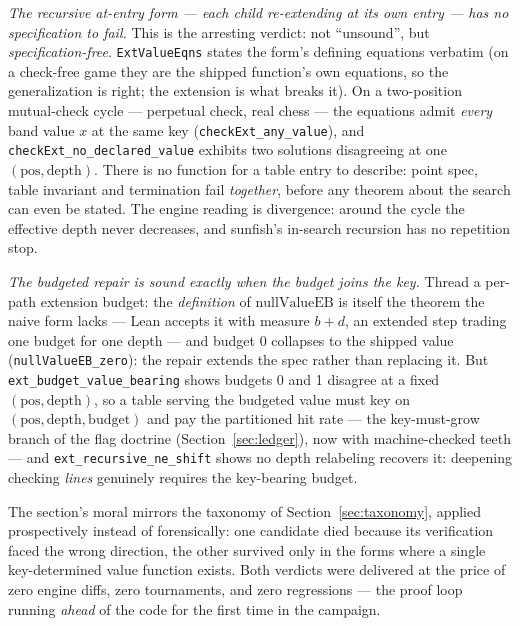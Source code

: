 \documentclass[11pt]{article}
\theoremstyle{plain}
\theoremstyle{definition}
\theoremstyle{remark}
\begin{document}
\emph{The recursive at-entry form --- each child re-extending at its
own entry --- has no specification to fail.}  This is the arresting
verdict: not ``unsound'', but \emph{specification-free}.
\texttt{ExtValueEqns} states the form's defining equations verbatim
(on a check-free game they are the shipped function's own equations,
so the generalization is right; the extension is what breaks it).  On
a two-position mutual-check cycle --- perpetual check, real chess ---
the equations admit \emph{every} band value $x$ at the same key
(\texttt{checkExt\_any\_value}), and
\texttt{checkExt\_no\_declared\_value} exhibits two solutions
disagreeing at one $(\mathrm{pos},\mathrm{depth})$.  There is no
function for a table entry to describe: point spec, table invariant
and termination fail \emph{together}, before any theorem about the
search can even be stated.  The engine reading is divergence: around
the cycle the effective depth never decreases, and sunfish's
in-search recursion has no repetition stop.

\emph{The budgeted repair is sound exactly when the budget joins the
key.}  Thread a per-path extension budget: the \emph{definition} of
$\mathrm{nullValueEB}$ is itself the theorem the naive form lacks ---
Lean accepts it with measure $b + d$, an extended step trading one
budget for one depth --- and budget 0 collapses to the shipped value
(\texttt{nullValueEB\_zero}): the repair extends the spec rather than
replacing it.  But \texttt{ext\_budget\_value\_bearing} shows budgets
0 and 1 disagree at a fixed $(\mathrm{pos},\mathrm{depth})$, so a
table serving the budgeted value must key on
$(\mathrm{pos},\mathrm{depth},\mathrm{budget})$ and pay the
partitioned hit rate --- the key-must-grow branch of the flag
doctrine (Section~\ref{sec:ledger}), now with machine-checked teeth
--- and \texttt{ext\_recursive\_ne\_shift} shows no depth relabeling
recovers it: deepening checking \emph{lines} genuinely requires the
key-bearing budget.

The section's moral mirrors the taxonomy of
Section~\ref{sec:taxonomy}, applied prospectively instead of
forensically: one candidate died because its verification faced the
wrong direction, the other survived only in the forms where a single
key-determined value function exists.  Both verdicts were delivered
at the price of zero engine diffs, zero tournaments, and zero
regressions --- the proof loop running \emph{ahead} of the code for
the first time in the campaign.

\end{document}
